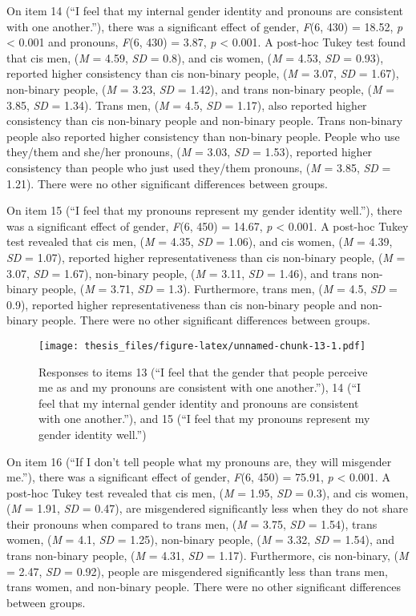 \documentclass[12pt,twoside]{reedthesis}
\begin{document}
On item 14 (``I feel that my internal gender identity and pronouns are consistent with one another.''), there was a significant effect of gender, \emph{F}(6, 430) = 18.52, \emph{p} \textless{} 0.001 and pronouns, \emph{F}(6, 430) = 3.87, \emph{p} \textless{} 0.001. A post-hoc Tukey test found that cis men, (\emph{M} = 4.59, \emph{SD} = 0.8), and cis women, (\emph{M} = 4.53, \emph{SD} = 0.93), reported higher consistency than cis non-binary people, (\emph{M} = 3.07, \emph{SD} = 1.67), non-binary people, (\emph{M} = 3.23, \emph{SD} = 1.42), and trans non-binary people, (\emph{M} = 3.85, \emph{SD} = 1.34). Trans men, (\emph{M} = 4.5, \emph{SD} = 1.17), also reported higher consistency than cis non-binary people and non-binary people. Trans non-binary people also reported higher consistency than non-binary people. People who use they/them and she/her pronouns, (\emph{M} = 3.03, \emph{SD} = 1.53), reported higher consistency than people who just used they/them pronouns, (\emph{M} = 3.85, \emph{SD} = 1.21). There were no other significant differences between groups.

On item 15 (``I feel that my pronouns represent my gender identity well.''), there was a significant effect of gender, \emph{F}(6, 450) = 14.67, \emph{p} \textless{} 0.001. A post-hoc Tukey test revealed that cis men, (\emph{M} = 4.35, \emph{SD} = 1.06), and cis women, (\emph{M} = 4.39, \emph{SD} = 1.07), reported higher representativeness than cis non-binary people, (\emph{M} = 3.07, \emph{SD} = 1.67), non-binary people, (\emph{M} = 3.11, \emph{SD} = 1.46), and trans non-binary people, (\emph{M} = 3.71, \emph{SD} = 1.3). Furthermore, trans men, (\emph{M} = 4.5, \emph{SD} = 0.9), reported higher representativeness than cis non-binary people and non-binary people. There were no other significant differences between groups.
\begin{figure}
\centering
\texttt{[image: thesis\_files/figure-latex/unnamed-chunk-13-1.pdf]}
\caption{\label{fig:unnamed-chunk-13}Responses to items 13 (``I feel that the gender that people perceive me as and my pronouns are consistent with one another.''), 14 (``I feel that my internal gender identity and pronouns are consistent with one another.''), and 15 (``I feel that my pronouns represent my gender identity well.'')}
\end{figure}
On item 16 (``If I don't tell people what my pronouns are, they will misgender me.''), there was a significant effect of gender, \emph{F}(6, 450) = 75.91, \emph{p} \textless{} 0.001. A post-hoc Tukey test revealed that cis men, (\emph{M} = 1.95, \emph{SD} = 0.3), and cis women, (\emph{M} = 1.91, \emph{SD} = 0.47), are misgendered significantly less when they do not share their pronouns when compared to trans men, (\emph{M} = 3.75, \emph{SD} = 1.54), trans women, (\emph{M} = 4.1, \emph{SD} = 1.25), non-binary people, (\emph{M} = 3.32, \emph{SD} = 1.54), and trans non-binary people, (\emph{M} = 4.31, \emph{SD} = 1.17). Furthermore, cis non-binary, (\emph{M} = 2.47, \emph{SD} = 0.92), people are misgendered significantly less than trans men, trans women, and non-binary people. There were no other significant differences between groups.
\end{document}

